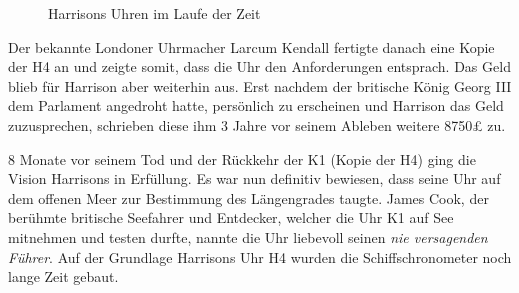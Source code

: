 \begin{refsection}
\begin{figure}[!htb]
\centering
\quad \quad
\centering
\quad \quad
\centering
\caption{Harrisons Uhren im Laufe der Zeit} 
\end{figure}
Der bekannte Londoner Uhrmacher Larcum Kendall fertigte danach eine Kopie der H4 an und zeigte somit, dass die Uhr den Anforderungen entsprach.
Das Geld blieb für Harrison aber weiterhin aus. Erst nachdem der britische König Georg III dem Parlament angedroht hatte, persönlich zu erscheinen und Harrison das Geld zuzusprechen, schrieben diese ihm 3 Jahre vor seinem Ableben weitere 8750£ zu.

8 Monate vor seinem Tod und der Rückkehr der K1 (Kopie der H4) ging die Vision Harrisons in Erfüllung. Es war nun definitiv bewiesen, dass seine Uhr auf dem offenen Meer zur Bestimmung des Längengrades taugte. James Cook, der berühmte britische Seefahrer und Entdecker, welcher die Uhr K1 auf See mitnehmen und testen durfte, nannte die Uhr liebevoll seinen \textit{nie versagenden Führer}.
Auf der Grundlage Harrisons Uhr H4 wurden die Schiffschronometer noch lange Zeit gebaut.




\end{refsection}
